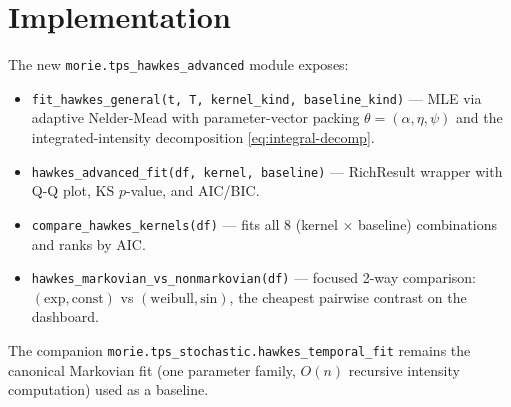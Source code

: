 \documentclass[article,shortnames,nojss]{jss}
\newcommand{\1}{\mathbbm{1}}
\theoremstyle{plain}
\theoremstyle{definition}
\begin{document}
\section{Implementation}\label{sec:implementation}

The new \texttt{morie.tps\_hawkes\_advanced} module exposes:
\begin{itemize}
\setlength{\itemsep}{1pt}
  \item \texttt{fit\_hawkes\_general(t, T, kernel\_kind, baseline\_kind)}
    --- MLE via adaptive Nelder-Mead with parameter-vector packing
    $\theta = (\alpha,\eta,\psi)$ and the integrated-intensity
    decomposition \eqref{eq:integral-decomp}.
  \item \texttt{hawkes\_advanced\_fit(df, kernel, baseline)} --- RichResult
    wrapper with Q-Q plot, KS $p$-value, and AIC/BIC.
  \item \texttt{compare\_hawkes\_kernels(df)} --- fits all 8
    (kernel $\times$ baseline) combinations and ranks by AIC.
  \item \texttt{hawkes\_markovian\_vs\_nonmarkovian(df)} --- focused
    2-way comparison: $(\text{exp},\text{const})$ vs
    $(\text{weibull},\text{sin})$, the cheapest pairwise contrast on
    the dashboard.
\end{itemize}
The companion \texttt{morie.tps\_stochastic.hawkes\_temporal\_fit}
remains the canonical Markovian fit (one parameter family,
$O(n)$ recursive intensity computation) used as a baseline.
\end{document}
